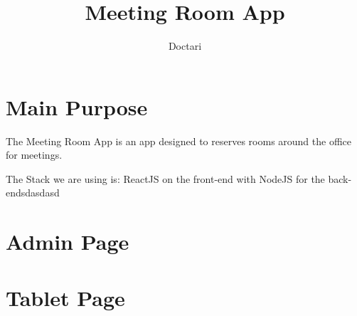 \documentclass{article}
\title{Meeting Room App}
\author{Doctari}
\date{}
\begin{document}
  \maketitle

  \section*{Main Purpose}
  The Meeting Room App is an app designed to reserves rooms around the office for meetings.

  The Stack we are using is: ReactJS on the front-end with NodeJS for the back-endsdasdasd

  \section*{Admin Page}
    


  \section*{Tablet Page}
\end{document}
